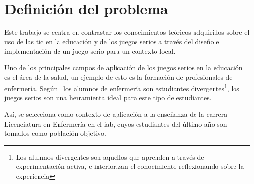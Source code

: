 \section{Definición del problema}

Este trabajo se centra en contrastar los conocimientos teóricos adquiridos sobre 
el uso de las \Gls{tic} en la educación y de los juegos serios a través del diseño 
e implementación de un juego serio para un contexto local.

Uno de los principales campos de aplicación de los juegos serios en la educación
es el área de la salud, un ejemplo de esto es la formación de profesionales de
enfermería. Según~\cite{humphreys2013developing} los alumnos de enfermería son
estudiantes divergentes\footnote{Los alumnos divergentes son aquellos que
    aprenden a través de experimentación activa, e interiorizan el conocimiento
    reflexionando sobre la experiencia\cite{humphreys2013developing}}, los
juegos serios son una herramienta ideal para este tipo de
estudiantes\cite{humphreys2013developing}. 

Así, se selecciona como contexto de aplicación a la enseñanza de la carrera
Licenciatura en Enfermería en el \Gls{iab}, cuyos estudiantes del último año son 
tomados como población objetivo.




